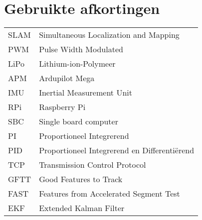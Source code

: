 \chapter*{Gebruikte afkortingen}
\begin{flushleft}
\renewcommand{\baselinestretch}{1.5}
\small\normalsize
\begin{longtable}{ll}
	SLAM & Simultaneous Localization and Mapping \\
	PWM & Pulse Width Modulated \\
	LiPo & Lithium-ion-Polymeer \\
	APM & Ardupilot Mega \\
	IMU & Inertial Measurement Unit \\
	RPi & Raspberry Pi \\
	SBC & Single board computer \\
	PI & Proportioneel Integrerend \\
	PID & Proportioneel Integrerend en Differenti\"erend \\
	TCP & Transmission Control Protocol \\
	GFTT & Good Features to Track \\
	FAST & Features from Accelerated Segment Test \\
	EKF & Extended Kalman Filter \\

 
\end{longtable}
\end{flushleft}